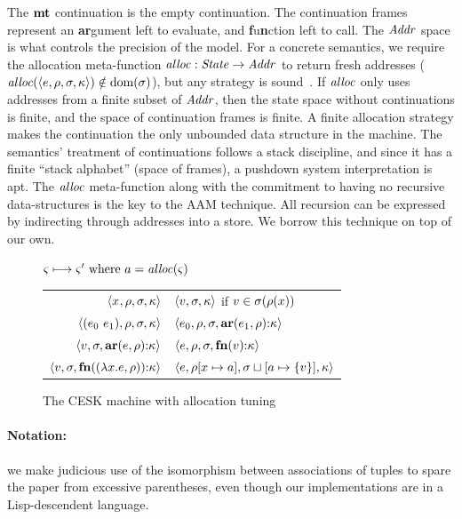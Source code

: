 %
The $\mathbf{mt}$ continuation is the empty continuation.
%
The continuation frames represent an \textbf{ar}gument left to evaluate, and \textbf{f}u\textbf{n}ction left to call.
%
%
The $\mathit{Addr}$ space is what controls the precision of the model.
%
For a concrete semantics, we require the allocation meta-function $\mathit{alloc} :
\mathit{State} \to \mathit{Addr}$ to return fresh addresses ($\mathit{alloc}(\langle e,\rho,\sigma,\kappa \rangle) \notin \text{dom}(\sigma)$), but any strategy is sound~\citep{dvanhorn:Might2009Posteriori}.
%
If $\mathit{alloc}$ only uses addresses from a finite subset of $\mathit{Addr}$, then the state space without continuations is finite, and the space of continuation frames is finite.
%
A finite allocation strategy makes the continuation the only unbounded data structure in the machine.
%
The semantics' treatment of continuations follows a stack discipline, and since it has a finite ``stack alphabet'' (space of frames), a pushdown system interpretation is apt.
%
The $\mathit{alloc}$ meta-function along with the commitment to having no recursive data-structures is the key to the AAM technique.
%
All recursion can be expressed by indirecting through addresses into a store.
%
We borrow this technique on top of our own.

\begin{figure}
  \centering
  $\varsigma \longmapsto \varsigma' \text{ where } a = \mathit{alloc}(\varsigma)$ \\
  \begin{tabular}{r|l}
    \hline
    $\langle x^{{}}, \rho, \sigma, \kappa \rangle$
    &
    $\langle v,\sigma,\kappa \rangle$ if $v \in \sigma(\rho(x))$
    \\
    $\langle (e_{0}\ e_{1}){}, \rho, \sigma, \kappa \rangle$
    &
    $\langle e_{0}, \rho, \sigma, \mathbf{ar}{}(e_{1},\rho){\tt :} \kappa \rangle$
    \\
    $\langle v, \sigma, \mathbf{ar}{}(e,\rho){\tt :} \kappa \rangle$
    &
    $\langle e, \rho, \sigma, \mathbf{fn}{}(v){\tt :} \kappa \rangle$
    \\
    $\langle v,\sigma,\mathbf{fn}{}((\lambda{} x. e, \rho)){\tt :} \kappa \rangle$
    &
    $\langle e, \rho[x \mapsto a], \sigma\sqcup[a \mapsto \{ v \}], \kappa \rangle$
  \end{tabular}
  \caption{The CESK machine with allocation tuning}
  \label{fig:base-semantics}
\end{figure}

\paragraph{Notation:} we make judicious use of the isomorphism between associations of tuples to spare the paper from excessive parentheses, even though our implementations are in a Lisp-descendent language.

